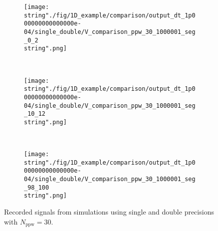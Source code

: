 
\hspace{-0.05\textwidth}
\begin{minipage}[t]{.5\textwidth}
%
\begin{figure}[H]
\captionsetup{width=0.95\textwidth,font=footnotesize,labelfont=footnotesize}
\centering
%
\begin{subfigure}[b]{1\textwidth}
%
\centering\texttt{[image: \\string"./fig/1D\_example/comparison/output\_dt\_1p000000000000000e-04/single\_double/V\_comparison\_ppw\_30\_1000001\_seg\_0\_2\\string".png]}
%
\end{subfigure}\hfill
\\[2ex]
%
\begin{subfigure}[b]{1\textwidth}
%
\centering\texttt{[image: \\string"./fig/1D\_example/comparison/output\_dt\_1p000000000000000e-04/single\_double/V\_comparison\_ppw\_30\_1000001\_seg\_10\_12\\string".png]}
%
\end{subfigure}\hfill
\\[2ex]
%
\begin{subfigure}[b]{1\textwidth}
%
\centering\texttt{[image: \\string"./fig/1D\_example/comparison/output\_dt\_1p000000000000000e-04/single\_double/V\_comparison\_ppw\_30\_1000001\_seg\_98\_100\\string".png]}
%
\end{subfigure}\hfill
%
\caption{Recorded signals from simulations using single and double precisions with $N_\text{ppw}=30$.}
\label{comparison_V_single_double_segments_ppw_30}
\end{figure}
%
\end{minipage}
%
\hfill %
%
